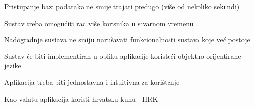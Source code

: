 			\begin{packed_enum}
				
			
				\item Pristupanje bazi podataka ne smije trajati predugo (više od nekoliko sekundi)
				\item Sustav treba omogućiti rad više korisnika u stvarnom vremenu
				\item Nadogradnje sustava ne smiju narušavati funkcionalnosti sustava koje već postoje
				\item Sustav će biti implementiran u obliku aplikacije koristeći objektno-orijentirane jezike
				\item Aplikacija treba biti jednostavna i intuitivna za korištenje
				\item Kao valutu aplikacija koristi hrvatsku kunu - HRK 
				
				
				
			\end{packed_enum}
			 
			 
			 
	